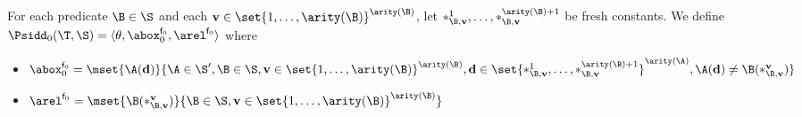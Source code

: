 \begin{definition}
  For each predicate $\B\in\S$ and each 
  $\mathbf{v}\in\set{1,\dots,\arity(\B)}^{\arity(\B)}$, let
  $*_{\B,\mathbf{v}}^1,\dots,*_{\B,\mathbf{v}}^{\arity(\B)+1}$ be fresh constants. We define
  $\Psidd_0(\T,\S)=\langle\theta,\abox_0^{\mathsf{f}_0},\arel^{\mathsf{f}_0}\rangle$
  where
  \begin{itemize}
  \item $\abox_0^{\mathsf{f}_0}=\mset{\A(\mathbf{d})}{\A\in\S',\B\in\S,\mathbf{v}\in\set{1,\dots,\arity(\B)}^{\arity(\B)},\mathbf{d}\in\set{*_{\B,\mathbf{v}}^1,\dots,*_{\B,\mathbf{v}}^{\arity(\B)+1}}^{\arity(\A)},\A(\mathbf{d})\ne\B(*_{\B,\mathbf{v}}^{\mathbf{v}})}$
  \item $\arel^{\mathsf{f}_0}=\mset{\B(*_{\B,\mathbf{v}}^{\mathbf{v}})}{\B\in\S,\mathbf{v}\in\set{1,\dots,\arity(\B)}^{\arity(\B)}}$\qedhere
  \end{itemize}

\end{definition}
